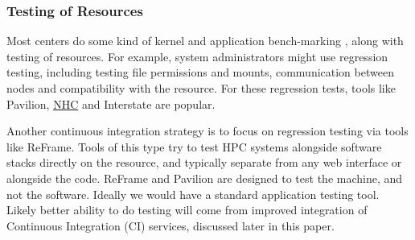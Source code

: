 \subsubsection{Testing of Resources}

Most centers do some kind of kernel and application bench-marking \cite{measuring-hpc}, along with testing of resources.
For example, system administrators might use regression testing, including testing file permissions and mounts,
communication between nodes and compatibility with the resource. For these regression tests, tools like Pavilion, \href{https://github.com/mej/nhc}{NHC} and Interstate are popular.

Another continuous integration strategy is to focus on regression testing via tools like ReFrame.
Tools of this type try to test HPC systems alongside software stacks directly on the resource, and typically separate from any web interface or alongside the code.
ReFrame and Pavilion are designed to test the machine, and not the software. Ideally we would have a standard application testing tool. Likely better ability to do testing will come from improved integration of Continuous Integration (CI) services, discussed later in this paper.
